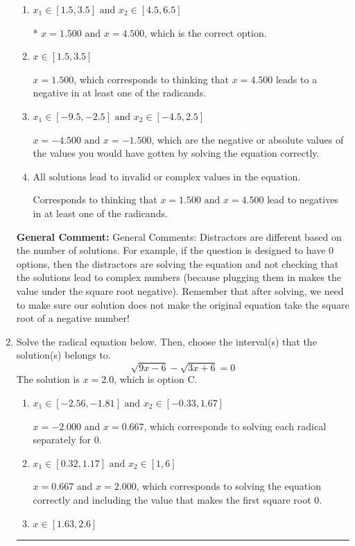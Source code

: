 \documentclass{extbook}[14pt]
\newcommand{\litem}[1]{\item #1

\rule{\textwidth}{0.4pt}}
\begin{document}
\begin{enumerate}
{\begin{enumerate}[label=\Alph*.]
$x = 4.500$, which corresponds to thinking that $x = 1.500$ leads to a negative in at least one of the radicands.
\item \( x_1 \in [1.5, 3.5] \text{ and } x_2 \in [4.5,6.5] \)

* $x = 1.500 \text{ and } x = 4.500$, which is the correct option.
\item \( x \in [1.5,3.5] \)

$x = 1.500$, which corresponds to thinking that $x = 4.500$ leads to a negative in at least one of the radicands.
\item \( x_1 \in [-9.5, -2.5] \text{ and } x_2 \in [-4.5,2.5] \)

$x = -4.500 \text{ and } x = -1.500$, which are the negative or absolute values of the values you would have gotten by solving the equation correctly.
\item \( \text{All solutions lead to invalid or complex values in the equation.} \)

Corresponds to thinking that $x = 1.500 \text{ and } x = 4.500$ lead to negatives in at least one of the radicands.
\end{enumerate}

\textbf{General Comment:} General Comments: Distractors are different based on the number of solutions. For example, if the question is designed to have 0 options, then the distractors are solving the equation and not checking that the solutions lead to complex numbers (because plugging them in makes the value under the square root negative). Remember that after solving, we need to make sure our solution does not make the original equation take the square root of a negative number!
}
\litem{
Solve the radical equation below. Then, choose the interval(s) that the solution(s) belongs to.
\[ \sqrt{9 x - 6} - \sqrt{3 x + 6} = 0 \]
The solution is \( x = 2.0 \), which is option C.\begin{enumerate}[label=\Alph*.]
\item \( x_1 \in [-2.56, -1.81] \text{ and } x_2 \in [-0.33,1.67] \)

$x = -2.000$ and $x = 0.667$, which corresponds to solving each radical separately for 0.
\item \( x_1 \in [0.32, 1.17] \text{ and } x_2 \in [1,6] \)

$x = 0.667$ and $x = 2.000$, which corresponds to solving the equation correctly and including the value that makes the first square root 0.
\item \( x \in [1.63,2.6] \)


\end{enumerate}}
\end{enumerate}
\end{document}
